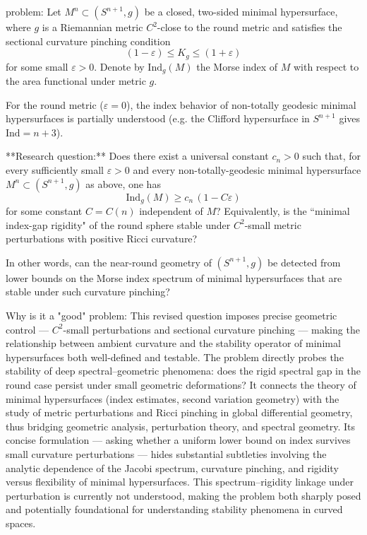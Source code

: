 problem:  
Let \( M^n \subset (S^{n+1},g) \) be a closed, two-sided minimal hypersurface, where \(g\) is a Riemannian metric \(C^2\)-close to the round metric and satisfies the sectional curvature pinching condition  
\[
(1-\varepsilon)\leq K_g \leq (1+\varepsilon)
\]
for some small \(\varepsilon>0\). Denote by \(\mathrm{Ind}_g(M)\) the Morse index of \(M\) with respect to the area functional under metric \(g\).  

For the round metric (\(\varepsilon=0\)), the index behavior of non-totally geodesic minimal hypersurfaces is partially understood (e.g. the Clifford hypersurface in \(S^{n+1}\) gives \(\mathrm{Ind}=n+3\)).  

**Research question:**  
Does there exist a universal constant \(c_n>0\) such that, for every sufficiently small \(\varepsilon>0\) and every non-totally-geodesic minimal hypersurface \(M^n \subset (S^{n+1},g)\) as above, one has  
\[
\mathrm{Ind}_g(M) \ge c_n\, (1 - C\varepsilon)
\]
for some constant \(C=C(n)\) independent of \(M\)?  
Equivalently, is the “minimal index-gap rigidity" of the round sphere stable under \(C^2\)-small metric perturbations with positive Ricci curvature?  

In other words, can the near-round geometry of \((S^{n+1},g)\) be detected from lower bounds on the Morse index spectrum of minimal hypersurfaces that are stable under such curvature pinching?

Why is it a "good" problem:  
This revised question imposes precise geometric control — \(C^2\)-small perturbations and sectional curvature pinching — making the relationship between ambient curvature and the stability operator of minimal hypersurfaces both well-defined and testable. The problem directly probes the stability of deep spectral–geometric phenomena: does the rigid spectral gap in the round case persist under small geometric deformations? It connects the theory of minimal hypersurfaces (index estimates, second variation geometry) with the study of metric perturbations and Ricci pinching in global differential geometry, thus bridging geometric analysis, perturbation theory, and spectral geometry.  
Its concise formulation — asking whether a uniform lower bound on index survives small curvature perturbations — hides substantial subtleties involving the analytic dependence of the Jacobi spectrum, curvature pinching, and rigidity versus flexibility of minimal hypersurfaces. This spectrum–rigidity linkage under perturbation is currently not understood, making the problem both sharply posed and potentially foundational for understanding stability phenomena in curved spaces.